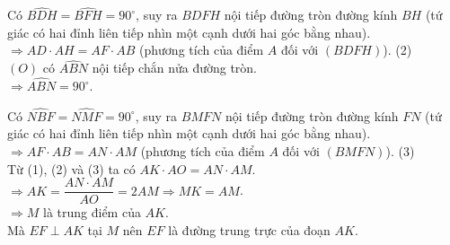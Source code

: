 \begin{ex}
{\begin{listEX}
{			Có $\widehat{BDH}=\widehat{BFH}=90^\circ$, suy ra $BDFH$ nội tiếp đường tròn đường kính $BH$ (tứ giác có hai đỉnh liên tiếp nhìn một cạnh dưới hai góc bằng nhau).\\
			$\Rightarrow AD\cdot AH=AF\cdot AB$ (phương tích của điểm $A$ đối với $(BDFH)$). (2)\\
			$(O)$ có $\widehat{ABN}$ nội tiếp chắn nửa đường tròn.\\
			$\Rightarrow \widehat{ABN}=90^\circ$.
		}{
		}
		Có $\widehat{NBF}=\widehat{NMF}=90^\circ$, suy ra $BMFN$ nội tiếp đường tròn đường kính $FN$ (tứ giác có hai đỉnh liên tiếp nhìn một cạnh dưới hai góc bằng nhau).\\
		$\Rightarrow AF\cdot AB=AN\cdot AM$ (phương tích của điểm $A$ đối với $(BMFN)$). (3)\\
		Từ (1), (2) và (3) ta có $AK\cdot AO=AN\cdot AM$.\\
		$\Rightarrow AK=\dfrac{AN\cdot AM}{AO}=2AM \Rightarrow MK=AM$.\\
		$\Rightarrow M$ là trung điểm của $AK$.\\
		Mà $EF\perp AK$ tại $M$ nên $EF$ là đường trung trực của đoạn $AK$.
		\end{listEX}
	}
\end{ex}

